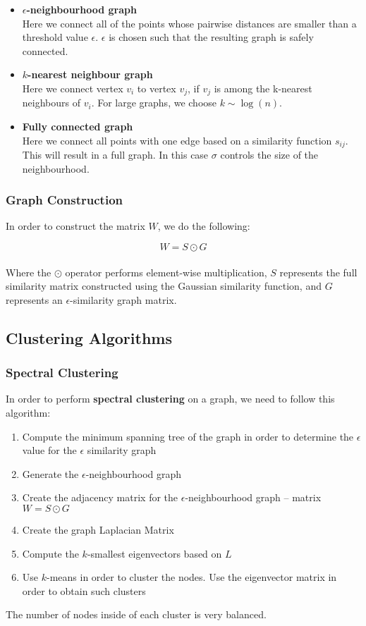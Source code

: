 \documentclass{article}
\begin{document}
\begin{itemize}
	\item \textbf{$\epsilon$-neighbourhood graph}
	\vspace{.2cm} \\
	Here we connect all of the points whose pairwise distances are smaller than a threshold value $\epsilon$. $\epsilon$ is chosen such that the resulting graph is safely connected.
	
	\item \textbf{$k$-nearest neighbour graph}
	\vspace{.2cm} \\
	Here we connect vertex $v_i$ to vertex $v_j$, if $v_j$ is among the k-nearest neighbours of $v_i$. For large graphs, we choose $k \sim \log(n)$.
	
	\item \textbf{Fully connected graph}
	\vspace{.2cm} \\
	Here we connect all points with one edge based on a similarity function $s_{ij}$. This will result in a full graph. In this case $\sigma$ controls the size of the neighbourhood.
\end{itemize}

\subsubsection{Graph Construction}
In order to construct the matrix $W$, we do the following:

\[ W = S \odot G \] \\
Where the $\odot$ operator performs element-wise multiplication, $S$ represents the full similarity matrix constructed using the Gaussian similarity function, and $G$ represents an $\epsilon$-similarity graph matrix.

\subsection{Clustering Algorithms}
\subsubsection{Spectral Clustering}
In order to perform \textbf{spectral clustering} on a graph, we need to follow this algorithm:

\begin{enumerate}
	\item Compute the minimum spanning tree of the graph in order to determine the $\epsilon$ value for the $\epsilon$ similarity graph
	\item Generate the $\epsilon$-neighbourhood graph
	\item Create the adjacency matrix for the $\epsilon$-neighbourhood graph -- matrix $W = S \odot G$
	\item Create the graph Laplacian Matrix
	\item Compute the $k$-smallest eigenvectors based on $L$
	\item Use $k$-means in order to cluster the nodes. Use the eigenvector matrix in order to obtain such clusters
\end{enumerate}
The number of nodes inside of each cluster is very balanced.
\end{document}
